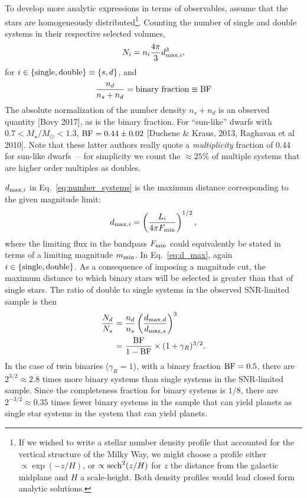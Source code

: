 \documentclass{emulateapj}
\begin{document}
To develop more analytic expressions in terms of observables, assume that the 
stars are homogeneously distributed\footnote{
If we wished to write a stellar number density profile that accounted for the 
vertical structure of the Milky Way, we might choose a profile either $\propto 
\exp(-z/H)$, or $\propto {\rm sech}^2(z/H)$ for $z$ the distance from the 
galactic midplane and $H$ a scale-height. Both density profiles would lead 
closed form analytic solutions.	}.
Counting the number of single and double systems in their respective selected 
volumes,
\begin{equation}
N_i = n_{i} \frac{4\pi}{3} d_{{\rm max},i}^3,
\label{eq:number_systems}
\end{equation}
for $i\in{\rm \{single,double\} } \equiv { \{s,d\} }$, and
\begin{equation}
\frac{n_{d}}{n_s+n_d} = {\rm binary\ fraction} \equiv {\rm BF}
\end{equation}
The absolute normalization of the number density $n_s + n_d$ is an observed
quantity [Bovy 2017], as is the binary fraction.
For ``sun-like'' dwarfs with $0.7<M_\star/M_\odot<1.3$,
${\rm BF}=0.44\pm0.02$ [Duchene \& Kraus, 2013, Raghavan et al 2010]. 
Note that these latter authors really quote a {\it multiplicity} fraction of
0.44 for sun-like dwarfs~--~for simplicity we count the $\approx 25\%$ of 
multiple systems that are higher order multiples as doubles.

$d_{{\rm max},i}$ in Eq.~\ref{eq:number_systems} is the maximum distance 
corresponding to the given magnitude limit:
\begin{equation}
d_{{\rm max},i} = \left(\frac{L_{i}}{4 \pi F_{{\rm min}}}\right)^{1/2},
\label{eq:d_max}
\end{equation}
where the limiting flux in the bandpass $F_{{\rm min}}$ could equivalently be 
stated in terms of a limiting magnitude $m_{{\rm min}}$.
In Eq.~\ref{eq:d_max}, again $i\in{\rm \{single,double\} }$. As a 
consequence of imposing a magnitude cut, the maximum distance to which binary 
stars will be selected is greater than that of single stars.
The ratio of double to single systems in the observed SNR-limited sample is 
then
\begin{align}
\frac{N_d}{N_s} &= 
	\frac{n_d}{n_s}
	\left( \frac{d_{{\rm max}, d} }{d_{{\rm max}, s}} \right)^3 \\
&= \frac{{\rm BF}}{1 - {\rm BF}} \times (1+\gamma_R)^{3/2}.
\label{eq:beta_model1}
\end{align}
In the case of twin binaries ($\gamma_R = 1$), with a binary fraction 
${\rm BF} = 0.5$, there are 
$2^{3/2}\approx2.8$ times more binary systems than single systems in the 
SNR-limited sample.
Since the completeness fraction for binary systems is $1/8$, there are 
$2^{-3/2}\approx0.35$ times fewer binary systems in the sample that can yield 
planets as single star systems in the system that can yield planets.
\end{document}
